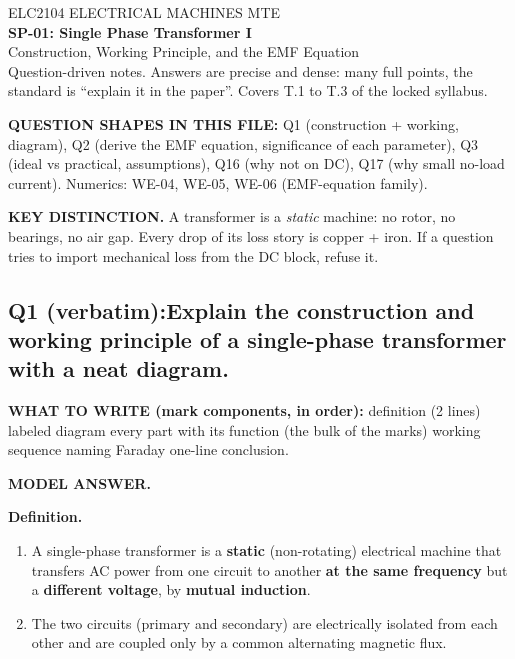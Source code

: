 \documentclass[11pt]{article}
\newcommand{\qhead}[2]{\subsection*{\color{copper}#1\quad\color{iron}#2}}
\newcommand{\tagline}[1]{\textbf{\color{copper}#1}}
\newcommand{\keydist}[1]{\vspace{2pt}\textbf{\color{red}KEY DISTINCTION.} #1}
\begin{document}
\begin{center}
{\footnotesize\color{copper} ELC2104 \textbar{} ELECTRICAL MACHINES \textbar{} MTE}\\[6pt]
{\LARGE\bfseries\color{iron} SP-01: Single Phase Transformer I}\\[2pt]
{\Large\color{copper} Construction, Working Principle, and the EMF Equation}\\[6pt]
{\footnotesize\color{muted} Question-driven notes. Answers are precise and dense: many full points, the standard is ``explain it in the paper''. Covers T.1 to T.3 of the locked syllabus.}
\end{center}

\vspace{2pt}
\tagline{QUESTION SHAPES IN THIS FILE:} Q1 (construction + working, diagram), Q2 (derive the EMF equation, significance of each parameter), Q3 (ideal vs practical, assumptions), Q16 (why not on DC), Q17 (why small no-load current). Numerics: WE-04, WE-05, WE-06 (EMF-equation family).
\vspace{2pt}

\keydist{A transformer is a \emph{static} machine: no rotor, no bearings, no air gap. Every drop of its loss story is copper + iron. If a question tries to import mechanical loss from the DC block, refuse it.}

\hrulefill

\qhead{Q1 (verbatim):}{Explain the construction and working principle of a single-phase transformer with a neat diagram.}

\tagline{WHAT TO WRITE (mark components, in order):} definition (2 lines) \textrightarrow{} labeled diagram \textrightarrow{} every part with its function (the bulk of the marks) \textrightarrow{} working sequence naming Faraday \textrightarrow{} one-line conclusion.

\tagline{MODEL ANSWER.}

\textbf{Definition.}
\begin{enumerate}[label=\arabic*.]
\item A single-phase transformer is a \textbf{static} (non-rotating) electrical machine that transfers AC power from one circuit to another \textbf{at the same frequency} but a \textbf{different voltage}, by \textbf{mutual induction}.
\item The two circuits (primary and secondary) are electrically isolated from each other and are coupled only by a common alternating magnetic flux.
\end{enumerate}
\end{document}

